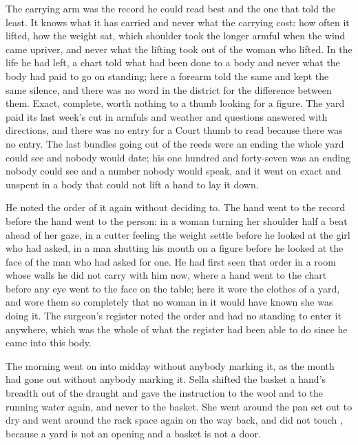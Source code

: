 The carrying arm was the record he could read best and the one that told the least. It knows what it has carried and never what the carrying cost: how often it lifted, how the weight sat, which shoulder took the longer armful when the wind came upriver, and never what the lifting took out of the woman who lifted. In the life he had left, a chart told what had been done to a body and never what the body had paid to go on standing; here a forearm told the same and kept the same silence, and there was no word in the district for the difference between them. Exact, complete, worth nothing to a thumb looking for a figure. The yard paid its last week's cut in armfuls and weather and questions answered with directions, and there was no entry for a Court thumb to read because there was no entry. The last bundles going out of the reeds were an ending the whole yard could see and nobody would date; his one hundred and forty-seven was an ending nobody could see and a number nobody would speak, and it went on exact and unspent in a body that could not lift a hand to lay it down.

He noted the order of it again without deciding to. The hand went to the record before the hand went to the person: in a woman turning her shoulder half a beat ahead of her gaze, in a cutter feeling the weight settle before he looked at the girl who had asked, in a man shutting his mouth on a figure before he looked at the face of the man who had asked for one. He had first seen that order in a room whose walls he did not carry with him now, where a hand went to the chart before any eye went to the face on the table; here it wore the clothes of a yard, and wore them so completely that no woman in it would have known she was doing it. The surgeon's register noted the order and had no standing to enter it anywhere, which was the whole of what the register had been able to do since he came into this body.

\scenebreak

The morning went on into midday without anybody marking it, as the month had gone out without anybody marking it. Sella shifted the basket a hand's breadth out of the draught and gave the instruction to the wool and to the running water again, and never to the basket. She went around the pan set out to dry and went around the rack space again on the way back, and did not touch , because a yard is not an opening and a basket is not a door.

